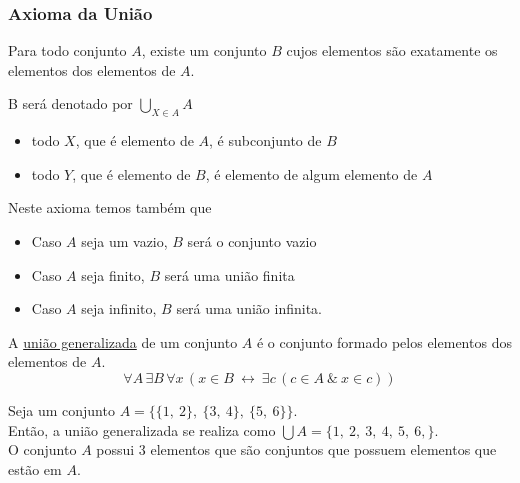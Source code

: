       \subsubsection{Axioma da União}
         \begin{stat}
            Para todo conjunto $A$, existe um conjunto $B$ cujos elementos são exatamente os elementos dos elementos de $A$.
         \end{stat}
         B será denotado por $\bigcup\limits_{X \in A}^{} A$
         \begin{itemize}
            \item todo $X$, que é elemento de $A$, é subconjunto de $B$
            \item todo $Y$, que é elemento de $B$, é elemento de algum elemento de $A$
         \end{itemize}
         Neste axioma temos também que
         \begin{itemize}
            \item Caso $A$ seja um vazio, $B$ será o conjunto vazio
            \item Caso $A$ seja finito, $B$ será uma união finita
            \item Caso $A$ seja infinito, $B$ será uma união infinita.
         \end{itemize}
         \begin{definition}
            A \underline{união generalizada} de um conjunto $A$ é o conjunto formado pelos elementos dos elementos de $A$.
            $$\forall A\,\exists B\,\forall x\,(x\in B\ \leftrightarrow\ \exists c\,(c\in A\ \&\ x\in c))$$
         \end{definition}
         \begin{exmp}
            Seja um conjunto $A = \{\{1,\ 2\},\ \{3,\ 4\},\ \{5,\ 6\}\}$.\\
            Então, a união generalizada se realiza como $\bigcup A = \{1,\ 2,\ 3,\ 4,\ 5,\ 6,\}$.\\
            O conjunto $A$ possui 3 elementos que são conjuntos que possuem elementos que estão em $A$.
         \end{exmp}


